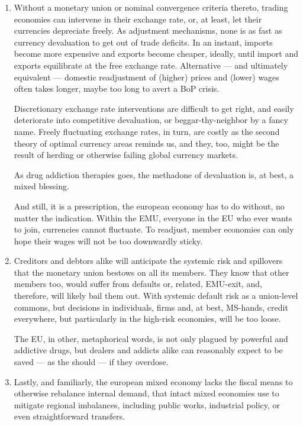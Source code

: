 \begin{enumerate}
	\item Without a monetary union or nominal convergence criteria thereto, trading economies can intervene in their exchange rate, or, at least, let their currencies depreciate freely.
	As adjustment mechanisms, none is as fast as currency devaluation to get out of trade deficits.
	In an instant, imports become more expensive and exports become cheaper, ideally, until import and exports equilibrate at the free exchange rate.
	Alternative --- and ultimately equivalent --- domestic readjustment of (higher) prices and (lower) wages often takes longer, maybe too long to avert a \gls{BoP} crisis.

	Discretionary exchange rate interventions are difficult to get right, and easily deteriorate into competitive devaluation, or beggar-thy-neighbor by a fancy name.
	Freely fluctuating exchange rates, in turn, are costly as the second theory of optimal currency areas reminds us, %
	and they, too, might be the result of herding or otherwise failing global currency markets.

	As drug addiction therapies goes, the methadone of devaluation is, at best, a mixed blessing.

	And still, it is a prescription, the european economy has to do without, no matter the indication.
	Within the \gls{EMU}, everyone in the \gls{EU} who ever wants to join, currencies cannot fluctuate.
	To readjust, member economies can only hope their wages will not be too downwardly sticky.

	\item Creditors and debtors alike will anticipate the systemic risk and spillovers that the monetary union bestows on all its members.
	They know that other members too, would suffer from defaults or, related, \gls{EMU}-exit, and, therefore, will likely bail them out.
	With systemic default risk as a union-level commons, but decisions in individuals, firms and, at best, \gls{MS}-hands, credit everywhere, but particularly in the high-risk economies, will be too loose.

	The \gls{EU}, in other, metaphorical words, is not only plagued by powerful and addictive drugs, but dealers and addicts alike can reasonably expect to be saved --- as the should --- if they overdose.

	\item Lastly, and familiarly, the european mixed economy lacks the fiscal means to otherwise rebalance internal demand, that intact mixed economies use to mitigate regional imbalances, including public works, industrial policy, or even straightforward transfers.
\end{enumerate}

